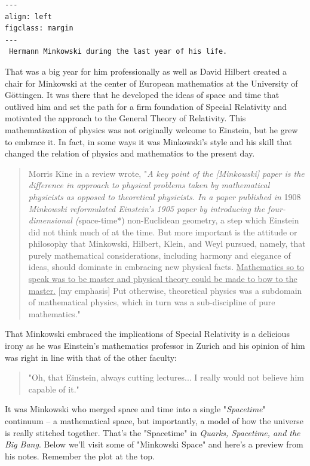 \documentclass[
]{article}
\begin{document}
\begin{verbatim}
---
align: left
figclass: margin
---
 Hermann Minkowski during the last year of his life.
\end{verbatim}

That was a big year for him professionally as well as David Hilbert
created a chair for Minkowski at the center of European mathematics at
the University of Göttingen. It was there that he developed the ideas of
space and time that outlived him and set the path for a firm foundation
of Special Relativity and motivated the approach to the General Theory
of Relativity. This mathematization of physics was not originally
welcome to Einstein, but he grew to embrace it. In fact, in some ways it
was Minkowski's style and his skill that changed the relation of physics
and mathematics to the present day.

\begin{quote}
Morris Kine in a review wrote, "\emph{A key point of the {[}Minkowski{]}
paper is the difference in approach to physical problems taken by
mathematical physicists as opposed to theoretical physicists. In a paper
published in} 1908 \emph{Minkowski reformulated Einstein's 1905 paper by
introducing the four-dimensional (}space-time*) non-Euclidean geometry,
a step which Einstein did not think much of at the time. But more
important is the attitude or philosophy that Minkowski, Hilbert, Klein,
and Weyl pursued, namely, that purely mathematical considerations,
including harmony and elegance of ideas, should dominate in embracing
new physical facts. \underline{Mathematics so to speak was to be master
and physical theory could be made to bow to the master.} {[}my
emphasis{]} Put otherwise, theoretical physics was a subdomain of
mathematical physics, which in turn was a sub-discipline of pure
mathematics."
\end{quote}

That Minkowski embraced the implications of Special Relativity is a
delicious irony as he was Einstein's mathematics professor in Zurich and
his opinion of him was right in line with that of the other faculty:

\begin{quote}
"Oh, that Einstein, always cutting lectures... I really would not
believe him capable of it."
\end{quote}

It was Minkowski who merged space and time into a single
"\emph{Spacetime}" continuum -- a mathematical space, but importantly, a
model of how the universe is really stitched together. That's the
"Spacetime" in \emph{Quarks, Spacetime, and the Big Bang}. Below we'll
visit some of "Minkowski Space" and here's a preview from his notes.
Remember the plot at the top.
\end{document}

